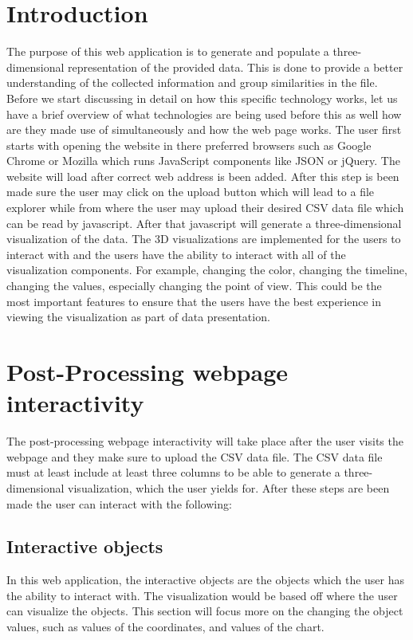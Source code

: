 \documentclass[journal,10pt,onecolumn,compsoc]{IEEEtran} \usepackage[margin=1.0in]{geometry} \usepackage{pdfpages}
\begin{document}
\section{Introduction}
The purpose of this web application is to generate and populate a three-dimensional representation of the provided data. This is done to provide a better understanding of the collected information and group similarities in the file. Before we start discussing in detail on how this specific technology works, let us have a brief overview of what technologies are being used before this as well how are they made use of simultaneously and how the web page works. The user first starts with opening the website in there preferred browsers such as Google Chrome or Mozilla which runs JavaScript components like JSON or jQuery.  The website will load after correct web address is been added. After this step is been made sure the user may click on the upload button which will lead to a file explorer while from where the user may upload their desired CSV data file which can be read by javascript. After that javascript will generate a three-dimensional visualization of the data. The 3D visualizations are implemented for the users to interact with and the users have the ability to interact with all of the visualization components. For example, changing the color, changing the timeline, changing the values, especially changing the point of view. This could be the most important features to ensure that the users have the best experience in viewing the visualization as part of data presentation.


\section{Post-Processing webpage interactivity}
The post-processing webpage interactivity will take place after the user visits the webpage and they make sure to upload the CSV data file. The CSV data file must at least include at least three columns to be able to generate a three-dimensional visualization, which the user yields for. After these steps are been made the user can interact with the following: 

    \subsection{Interactive objects}
    In this web application, the interactive objects are the objects which the user has the ability to interact with. The visualization would be based off where the user can visualize the objects. This section will focus more on the changing the object values, such as values of the coordinates, and values of the chart.
    
\end{document}
